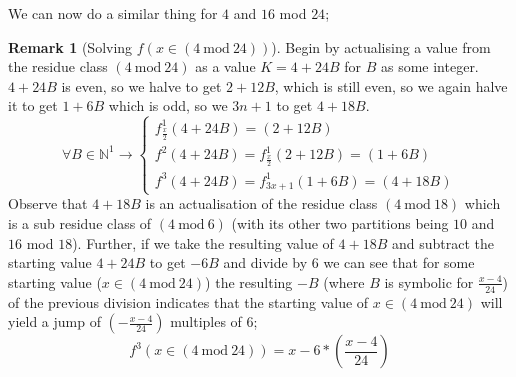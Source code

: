 \documentclass[12pt,a4paper]{amsart}
\numberwithin{equation}{section}
\theoremstyle{plain}
\theoremstyle{definition}
\newtheorem{Rem}[Th]{Remark}
\begin{document}
We can now do a similar thing for $4$ and $16$ mod $24$;

\begin{Rem}[Solving $f \left ( x \in \left ( 4\:\mathrm{mod}\:24 \right ) \right )$]
Begin by actualising a value from the residue class $\left ( 4\:\mathrm{mod}\:24 \right )$ as a value $K = 4 + 24B$ for $B$ as some integer. $4 + 24B$ is even, so we halve to get $2 + 12B$, which is still even, so we again halve it to get $1+6B$ which is odd, so we $3n+1$ to get $4+18B$.
\begin{equation}
\forall B \in \mathbb{N}^{1} \rightarrow \left \{  \begin{matrix}
f^{1}_{\frac{x}{2}} \left ( 4+24B \right ) = \left ( 2+12B \right ) \\ 
f^{2} \left ( 4+24B \right ) = f^{1}_{\frac{x}{2}} \left ( 2+12B \right ) =  \left ( 1+6B \right ) \\
f^{3} \left ( 4+24B \right ) = f^{1}_{3x+1} \left ( 1+6B \right ) =  \left ( 4+18B \right ) 
\end{matrix} \right.
\end{equation}
Observe that $4+18B$ is an actualisation of the residue class  $\left ( 4\:\mathrm{mod}\:18 \right )$ which is a sub residue class of  $\left ( 4\:\mathrm{mod}\:6 \right )$ (with its other two partitions being $10$ and $16$ mod $18$). Further, if we take the resulting value of $4+18B$ and subtract the starting value $4+24B$ to get $-6B$ and divide by $6$ we can see that for some starting value ($x \in \left ( 4\:\mathrm{mod}\:24 \right )$) the resulting $-B$ (where $B$ is symbolic for $\frac{x-4}{24}$) of the previous division indicates that the starting value of $x \in \left ( 4\:\mathrm{mod}\:24 \right )$ will yield a jump of $\left ( -\frac{x-4}{24} \right )$ multiples of $6$;
\begin{equation}
f^{3} \left ( x \in \left ( 4\:\mathrm{mod}\:24 \right ) \right ) = x-6*\left ( \frac{x-4}{24} \right )
\end{equation}
\end{Rem}
\end{document}
